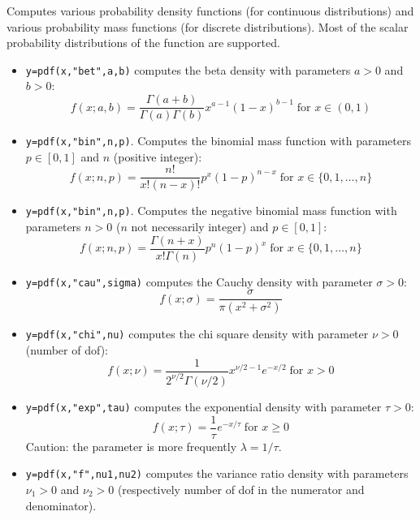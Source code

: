 \begin{mandescription}
  Computes various probability density functions (for continuous
  distributions) 
  and various probability mass functions (for discrete distributions). Most of the
  scalar probability distributions of the 
  function are supported. 
\begin{itemize}

\item {} \verb!y=pdf(x,"bet",a,b)! computes the beta
  density with parameters $a > 0$ and $b > 0$:
$$
     f(x; a, b) =
        \frac{\Gamma(a+b)}{\Gamma(a) \Gamma(b)} x^{a-1}(1-x)^{b-1} \;
        \mbox{for } x \in (0,1)
$$

\item {} \verb!y=pdf(x,"bin",n,p)!. Computes
  the binomial mass function with parameters $p \in [0,1]$ and $n$
  (positive integer):
$$
     f(x; n, p) = \frac{ n! }{ x! (n-x)!} p^x (1-p)^{n-x} \;\mbox{for } x \in \{0,1,\dots,n\}
$$

\item {} \verb!y=pdf(x,"bin",n,p)!. Computes
  the negative binomial mass function with parameters $n > 0$ ($n$ not
  necessarily integer) and $p \in [0,1]$:
$$
     f(x; n, p) = \frac{ \Gamma(n+x) }{ x! \Gamma(n)} p^n (1-p)^x \;\mbox{for } x \in \{0,1,\dots,n\}
$$


\item {} \verb!y=pdf(x,"cau",sigma)! computes the Cauchy
  density with parameter $\sigma > 0$:
$$
     f(x; \sigma) = \frac{ \sigma }{ \pi ( x^2 + \sigma^2 ) }
$$


\item {} \verb!y=pdf(x,"chi",nu)! computes the chi square
  density with parameter $\nu > 0$ (number of dof):
$$
     f(x; \nu) = \frac{1}{2^{\nu/2} \Gamma(\nu/2)} x^{\nu/2-1} e^{-x/2}\; \mbox{for } x > 0 
$$


\item {} \verb!y=pdf(x,"exp",tau)! computes the exponential
  density with parameter $\tau > 0$:
$$
     f(x; \tau) = \frac{1}{\tau} e^{-x/\tau} \; \mbox{for } x
     \ge 0
$$
Caution: the parameter is more frequently $\lambda = 1/\tau$.


\item {} \verb!y=pdf(x,"f",nu1,nu2)! computes
  the variance ratio density with parameters $\nu_1 > 0$ and $\nu_2 >
  0$ (respectively number of dof in the numerator and denominator).



\end{itemize}
\end{mandescription}
